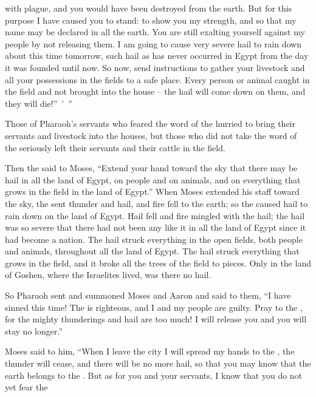 {with plague,
and you would have been destroyed
from
the earth.
But
for
this
purpose
I have caused you to stand: to show
you my strength,
and so
that my name
may be declared
in all
the earth.
You are still
exalting
yourself against my people
by not
releasing them.
I am going
to cause very
severe
hail to rain
down about this time
tomorrow,
such hail
as has
never
occurred in Egypt
from
the day
it was founded
until
now.
So now,
send
instructions to gather
your livestock
and all
your possessions in the fields
to a safe place. Every
person
or animal
caught
in the field
and not
brought
into the house
– the hail
will come down
on
them, and they will die!” ’ ”
\par }{\PP {}Those of Pharaoh’s
servants
who feared
the word
of the {}
hurried
to bring their servants
and livestock
into
the houses,
but those who
did not
take
the word
of the {}
seriously
left
their servants
and their cattle
in the field.
\par }{\PP {}Then the
{}
said to
Moses,
“Extend
your hand
toward the sky
that there may be
hail
in all
the land
of Egypt,
on
people
and on
animals,
and on
everything
that grows
in the field
in the land
of Egypt.”
When Moses
extended
his staff
toward the
sky,
the {}
sent thunder
and hail,
and fire
fell to the earth;
so the
{}
caused hail
to rain
down on
the land
of Egypt.
Hail
fell and fire
mingled
with the hail;
the hail was so
severe
that
there had
not
been any like
it in all
the land
of Egypt
since
it had become
a nation.
The hail
struck
everything
in the open fields,
both people
and animals,
throughout all
the land
of Egypt.
The
hail
struck
everything
that grows
in the field,
and it broke
all
the trees
of the field to pieces.
Only
in the land
of Goshen,
where
the Israelites
lived, was there
no
hail.
\par }{\PP {}So Pharaoh
sent
and summoned
Moses
and Aaron
and said
to them,
“I have sinned
this time! The
{}
is righteous,
and I
and my people
are guilty.
Pray
to
the {}, for the mighty
thunderings
and hail
are too much! I will release
you and you will stay
no
longer.”
\par }{\PP {}Moses
said
to
him, “When I leave
the
city
I will spread
my hands
to
the {}, the thunder
will cease,
and there will be
no
more
hail,
so that you may
know
that
the earth
belongs to the
{}.
But as for you
and your servants,
I know
that
you do not yet
fear
the {}
}
